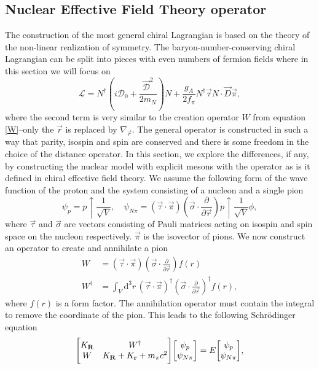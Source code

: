 \subsection{Nuclear Effective Field Theory operator}
The construction of the most general chiral Lagrangian is based on the theory of the non-linear realization of symmetry. The baryon-number-conserving chiral Lagrangian can be split into pieces with even numbers of fermion fields where in this section we will focus on 
\begin{equation}
	\mathcal{L} = N^\dagger \left(i\mathcal{D}_0+\frac{\vec{\mathcal{D}}^2}{2m_N} \right)N+\frac{g_A}{2f_\pi}N^\dagger\vec{\tau}N\cdot \vec{D}\vec{\pi},
\end{equation}
where the second term is very similar to the creation operator $W$ from equation \eqref{W}--only the $\vec{r}$ is replaced by $\nabla_{\vec{r}}$. The general operator is constructed in such a way that parity, isospin and spin are conserved and there is some freedom in the choice of the distance operator. In this section, we explore the differences, if any, by constructing the nuclear model with explicit mesons with the operator as is it defined in chiral effective field theory. We assume the following form of the wave function of the proton and the system consisting of a nucleon and a single pion
\begin{equation}
	\psi_p = p\uparrow\frac{1}{\sqrt{V}}, \quad \psi_{N\pi} = (\vec{\tau}\cdot \vec{\pi})(\vec{\sigma}\cdot \frac{\partial}{\partial\vec{r}})p\uparrow \frac{1}{\sqrt{V}}\phi,
\end{equation}
where $\vec{\tau}$ and $\vec{\sigma}$ are vectors consisting of Pauli matrices acting on isospin and spin space on the nucleon respectively. $\vec{\pi}$ is the isovector of pions. We now construct an operator to create and annihilate a pion
\begin{align}
	W & = (\vec{\tau}\cdot \vec{\pi})(\vec{\sigma}\cdot \frac{\partial}{\partial\vec{r}})f(r) \\
	W^\dagger & = \int_V \text{d}^3 r \, (\vec{\tau}\cdot \vec{\pi})^\dagger(\vec{\sigma}\cdot \frac{\partial}{\partial\vec{r}})^\dagger f(r),
\end{align}
where $f(r)$ is a form factor. The annihilation operator must contain the integral to remove the coordinate of the pion. This leads to the following Schrödinger equation
\begin{equation}
	\mqty[K_{\vec{R}} & W^\dagger \\ W & K_{\vec{R}}+K_{\vec{r}}+m_\pi c^2]\mqty[\psi_p \\ \psi_{N\pi}]=E\mqty[\psi_p \\ \psi_{N\pi}],
\end{equation}
